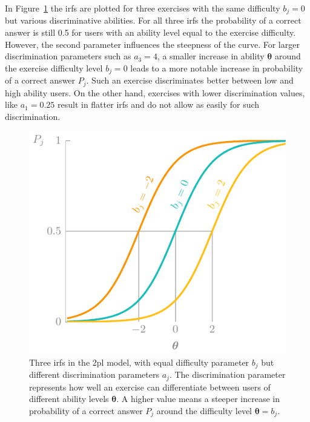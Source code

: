 In Figure~\ref{fig:2pl} the \glspl{irf} are plotted for three exercises with the same difficulty $b_j = 0$ but various discriminative abilities. 
For all three \glspl{irf} the probability of a correct answer is still 0.5 for users with an ability level equal to the exercise difficulty.
However, the second parameter influences the steepness of the curve.
For larger discrimination parameters such as $a_3 = 4$, a smaller increase in ability $\bm\theta$ around the exercise difficulty level $b_j = 0$ leads to a more notable increase in probability of a correct answer $P_j$.
Such an exercise discriminates better between low and high ability users.
On the other hand, exercises with lower discrimination values, like $a_1 = 0.25$ result in flatter \glspl{irf} and do not allow as easily for such discrimination.

\begin{figure}
    \centering
    \includegraphics[page=2]{03-education/figures/tikzfigures.pdf}
    \caption[Item response functions of the 2PL model]{Three \glspl{irf} in the \gls{2pl} model, with equal difficulty parameter $b_j$ but different discrimination parameters $a_j$. The discrimination parameter represents how well an exercise can differentiate between users of different ability levels $\bm\theta$. A higher value means a steeper increase in probability of a correct answer $P_j$ around the difficulty level $\bm\theta = b_j$.}
    \label{fig:2pl}
\end{figure}

%
%    

